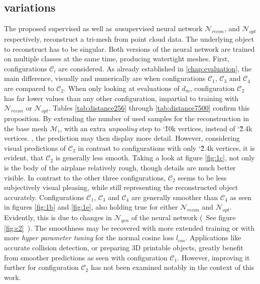 \subsection*{variations}
  The proposed supervised as well as \emph{un}supervised neural network $\mathcal{N}_{recon}$, and $\mathcal{N}_{opt}$ respectively, 
  reconstruct a tri-mesh from point cloud data. The underlying object to reconstruct has to be singular. Both versions of the neural 
  network are trained on multiple classes at the same time, producing watertight meshes.
  First, configurations $\mathcal{C}_i$ are considered. As already established in \ref{chap:evaluation}, the main difference, visually and 
  numerically are when configurations $\mathcal{C}_1$, $\mathcal{C}_3$ and $\mathcal{C}_4$ are compared to $\mathcal{C}_2$. When only looking
  at evaluations of $d_m$, configuration $\mathcal{C}_2$ has far lower values than any other configuration, impartial to training with 
  $\mathcal{N}_{recon}$ or $\mathcal{N}_{opt}$. Tables \ref{tab:distance256} through \ref{tab:distance7500} confirm this proposition. By extending the number of used
  samples for the reconstruction in the base mesh $\mathcal{M}_i$, with an extra \emph{unpooling} step to \char`\~10k vertices, instead of
  \char`\~2.4k vertices.  , the prediction may then display more detail. 
  However, considering visual predictions of $\mathcal{C}_2$ in contrast to configurations with only \char`\~2.4k vertices, it is evident, 
  that $\mathcal{C}_2$ is generally less smooth. Taking a look at figure \ref{fig:1c}, not only is the body of the airplane relatively rough,
  though details are much better visible. In contrast to the other three configurations, $\mathcal{C}_2$ seems to be less subjectively 
  visual pleasing, while still representing the reconstructed object accurately. Configurations $\mathcal{C}_1$, $\mathcal{C}_3$ and 
  $\mathcal{C}_4$ are generally smoother than $\mathcal{C}_4$ as seen in figures \ref{fig:1b} and \ref{fig:1e}, also holding true for either $\mathcal{N}_{recon}$ 
  and $\mathcal{N}_{opt}$.
  Evidently, this is due to changes in $\mathcal{N}_{gcn}$ of the neural network (~See figure \ref{fig:c2}~). The smoothness may be recovered 
  with more extended training or with more \emph{hyper parameter tuning} for the normal cosine loss $l_{cos}$. Applications like accurate 
  collision detection, or preparing 3D printable objects, greatly benefit from smoother predictions as seen with configuration $\mathcal{C}_1$.
  However, improving it further for configuration $\mathcal{C}_2$ has not been examined notably in the context of this work.

